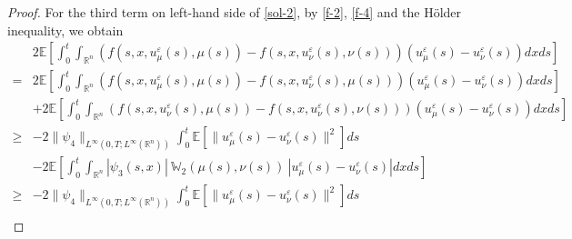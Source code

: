 \documentclass[11pt]{article}
\numberwithin{equation}{section}
\theoremstyle{plain}
\def\geq{\geqslant}
\begin{document}
\begin{proof}
 For the third term on left-hand side of \eqref{sol-2},
 by \eqref{f-2}, \eqref{f-4} and the H\"{o}lder inequality, we obtain
\begin{align}\label{sol-3}
       & 2 \mathbb{E}
              \left[\int_0^t \int_{\mathbb{R}^n}
                      \left( f(s, x, u_\mu^\varepsilon (s) , \mu(s) )
                             - f(s, x, u_\nu^\varepsilon (s), \nu(s) )
                      \right)
                      \left( u_\mu^\varepsilon (s)
                             - u_\nu^\varepsilon (s)
                      \right) dx ds
               \right]
               \nonumber \\
     = & 2 \mathbb{E}
              \left[\int_0^t \int_{\mathbb{R}^n}
                      \left( f(s, x, u_\mu^\varepsilon (s) , \mu(s) )
                             - f(s, x, u_\nu^\varepsilon (s), \mu(s) )
                      \right)
                      \left( u_\mu^\varepsilon (s)
                             - u_\nu^\varepsilon (s)
                      \right) dx ds
               \right]
               \nonumber \\
       & + 2 \mathbb{E}
              \left[\int_0^t \int_{\mathbb{R}^n}
                      \left( f(s, x, u_\nu^\varepsilon (s) , \mu(s) )
                             - f(s, x, u_\nu^\varepsilon (s), \nu(s) )
                      \right)
                      \left( u_\mu^\varepsilon (s)
                             - u_\nu^\varepsilon (s)
                      \right) dx ds
               \right]
               \nonumber \\
  \geq & - 2 \| \psi_4 \|_{L^\infty(0,T; L^\infty(\mathbb{R}^n) ) }
           \int_0^t \mathbb{E}
                      \left[ \| u_\mu^\varepsilon (s)
                             - u_\nu^\varepsilon (s) \|^2
                      \right] ds  \nonumber \\
       & - 2 \mathbb{E}
              \left[ \int_0^t \int_{\mathbb{R}^n}
                        |\psi_3(s,x)| \
                       \mathbb{W}_2 \left( \mu(s), \nu(s) \right) \
                       \left| u_\mu^\varepsilon (s)
                              - u_\nu^\varepsilon (s)
                       \right| dx ds
               \right]
               \nonumber \\
  \geq & - 2 \| \psi_4 \|_{L^\infty(0,T; L^\infty(\mathbb{R}^n) ) }
           \int_0^t \mathbb{E}
                      \left[ \| u_\mu^\varepsilon (s)
                             - u_\nu^\varepsilon (s) \|^2
                      \right] ds  \nonumber \\

\end{align}
\end{proof}
\end{document}

